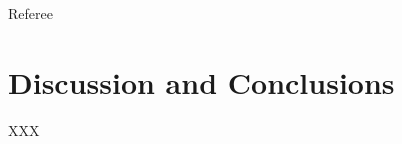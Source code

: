 \documentclass[12pt]{cmuthesis}
\begin{document}
Referee~\cite{Referee_draft}


\chapter{Discussion and Conclusions}

XXX

%

\backmatter


\renewcommand{\bibsection}{\chapter{\bibname}}

\end{document}

